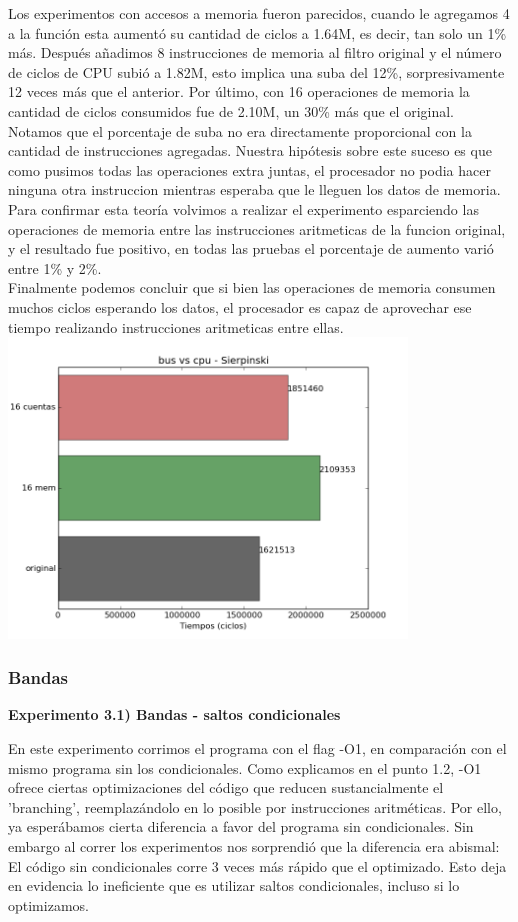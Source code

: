 \documentclass[a4paper]{article}
\begin{document}
Los experimentos con accesos a memoria fueron parecidos, cuando le agregamos 4 a la función esta aumentó su cantidad de ciclos a 1.64M, es decir, tan solo un 1\% más. Después añadimos 8 instrucciones de memoria al filtro original y el número de ciclos de CPU subió a 1.82M, esto implica una suba del 12\%, sorpresivamente 12 veces más que el anterior. Por último, con 16 operaciones de memoria la cantidad de ciclos consumidos fue de 2.10M, un 30\% más que el original. Notamos que el porcentaje de suba no era directamente proporcional con la cantidad de instrucciones agregadas. Nuestra hipótesis sobre este suceso es que como pusimos todas las operaciones extra juntas, el procesador no podia hacer ninguna otra instruccion mientras esperaba que le lleguen los datos de memoria. Para confirmar esta teoría volvimos a realizar el experimento esparciendo las operaciones de memoria entre las instrucciones aritmeticas de la funcion original, y el resultado fue positivo, en todas las pruebas el porcentaje de aumento varió entre 1\% y 2\%. \\ 
Finalmente podemos concluir que si bien las operaciones de memoria consumen muchos ciclos esperando los datos, el procesador es capaz de aprovechar ese tiempo realizando instrucciones aritmeticas entre ellas. \\

\includegraphics[width=300pt]{imagenes/bvmsierp.png}

\subsubsection{Bandas}

\textbf{Experimento 3.1) Bandas - saltos condicionales}

En este experimento corrimos el programa con el flag -O1, en comparaci\'{o}n con el mismo programa sin los condicionales. Como explicamos en el punto 1.2, -O1 ofrece ciertas optimizaciones del c\'{o}digo que reducen sustancialmente el 'branching', reemplaz\'{a}ndolo en lo posible por instrucciones aritm\'{e}ticas. Por ello, ya esper\'{a}bamos cierta diferencia a favor del programa sin condicionales. Sin embargo al correr los experimentos nos sorprendi\'{o} que la diferencia era abismal: El c\'{o}digo sin condicionales corre 3 veces m\'{a}s r\'{a}pido que el optimizado. Esto deja en evidencia lo ineficiente que es utilizar saltos condicionales, incluso si lo optimizamos.
\end{document}
